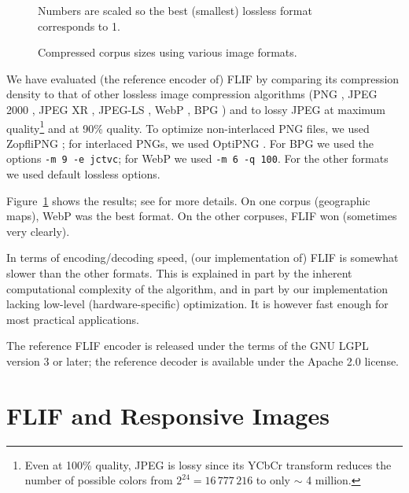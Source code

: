 \documentclass{article}
\begin{document}
\begin{figure}
Numbers are scaled so the best (smallest) lossless format corresponds to 1.
\caption{Compressed corpus sizes using various image formats.}
\label{benchmarks}
\end{figure}




We have evaluated (the reference encoder of) FLIF
by comparing its compression density to that of other lossless image compression algorithms
(PNG \cite{PNG}, JPEG 2000 \cite{JPEG2000}, JPEG XR \cite{JPEGXR}, JPEG-LS \cite{JPEGLS}, WebP \cite{WebP},
BPG \cite{BPG}) %
and to lossy JPEG \cite{JPEG} at maximum quality\footnote{
Even at 100\% quality, JPEG is lossy since its YCbCr transform reduces the number of
possible colors from $2^{24} = 16\,777\,216$ to only $\sim$ 4 million.} %
and at 90\% quality.
To optimize non-interlaced PNG files, we used ZopfliPNG \cite{ZopfliPNG};
for %
interlaced PNGs, we used OptiPNG \cite{OptiPNG}.
For BPG we used the options {\tt -m 9 -e jctvc}; for WebP we used {\tt -m 6 -q 100}.
For the other formats we used default lossless options.

Figure~\ref{benchmarks} shows the results; see \cite{flif_benchmarks} for more details.
%
On one corpus (geographic maps), WebP was the best format.
On the other corpuses, FLIF won (sometimes very clearly).

In terms of encoding/decoding speed, (our implementation of) FLIF is somewhat slower than the other formats.
This is explained in part by the inherent computational complexity of the algorithm, and in part by our implementation
lacking low-level (hardware-specific) optimization. It is however fast enough for most practical applications.

The reference FLIF encoder \cite{flif_website, flif_implementation}
is released under the terms of the GNU LGPL version 3 or later;
the reference decoder is available under the Apache 2.0 license.


\section{FLIF and Responsive Images}
\label{sec:conclusion}
\end{document}
